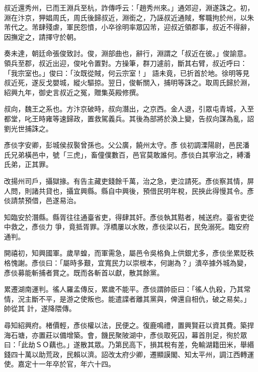 \begin{pinyinscope}
 叔近還秀州，已而王淵兵至杭，詐傳呼云：「趙秀州來。」通郊迎，淵遂誅之。初，淵在汴京，狎娼周氏，周氏後歸叔近，淵銜之，乃誣叔近通賊，奪職拘於州，以朱芾代之。芾肆殘虐，軍民怨憤，小卒徐明率眾囚芾，迎叔近領郡事，叔近不得辭，因撫定之，請擇守於朝。



 奏未達，朝廷命張俊致討。俊，淵部曲也，辭行，淵謂之「叔近在彼。」俊諭意。領兵至郡，叔近出迎，俊叱令置對。方操筆，群刀遽前，斷其右臂，叔近呼曰：「我宗室也。」俊曰：「汝既從賊，何云宗室！」
 語未竟，已折首於地。徐明等見叔近死，遂反戈嬰城，縱火驅掠。翌日，俊斬關入，捕明等誅之。取周氏歸於淵，紹興九年，御史言叔近之冤，贈集英殿修撰。



 叔向，魏王之系也。方汴京破時，叔向潛出，之京西。金人退，引眾屯青城，入至都堂，叱王時雍等速歸政，置救駕義兵。其後為部將於渙上變，告叔向謀為亂，詔劉光世捕誅之。



 彥倓字安卿，彭城侯叔褧曾孫也。父公廣，饒州太守。彥
 倓初調溧陽尉，邑民潘氏兄弟橫邑中，號「三虎」，畜僮僕數百，邑官莫敢誰何。彥倓白其寧治之，縛潘氏弟，正其罪。



 改揚州司戶，攝獄掾。有告主藏吏錢餘千萬，治之急，吏泣請死。彥倓察其情，屏人問，則諸共貸也，攝宜興縣。縣自中興後，預借民明年稅，民挾此得慢其令。彥倓請禁預借，邑遂易治。



 知臨安於潛縣。縣胥往往通臺省吏，得肆其奸。彥倓執其黠者，械送府。臺省吏從中救之，彥倓力
 爭，竟抵胥罪。浮橋屢以水敗，彥倓梁以石，民免溺死。臨安府通判。



 開禧初，知興國軍。歲旱蝗，而軍需急，屬邑令吳格負上供銀尤多，彥倓坐累貶秩格愧謝。彥倓曰：「屬時多艱，宜寬民力以崇根本，何謝為？」潰卒據外城為變，彥倓募能斬捕者賞之。既而各斬首以獻，散其餘黨。



 累遷湖南運判。徭人羅孟傳反，累歲不能平。彥倓謂帥臣曰：「徭人仇殺，乃其常情，況主斷不平，是游之使叛也。能遣諜者離其黨與，俾還自相仇，破之易矣。」帥從其
 計，遂降隈傳。



 尋知紹興府。楮價輕，彥倓權以法，民便之。復鹿鳴禮，置興賢莊以資其費。築捍海石塘，亦置莊以備增築。會，饑民聚陂湖中，彥倓取死囚，幕首刖足，徇於眾曰：「此劫ＳＯ藕也。」遂散其眾。乃第民高下，損其稅有差，免輸湖籍田米，舉緡錢四十萬以助荒政，民賴以濟。詔改太府少卿，遷顯謨閣、知太平州，調江西轉運使。嘉定十一年卒於官，年六十四。




\end{pinyinscope}
